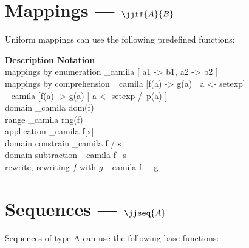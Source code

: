 \documentclass[english,a4paper]{article}
\begin{document}
\section{Mappings --- $\jjff{A}{B}$ }

Uniform mappings can use the following predefined functions:

\begin{framed}
\noindent \textbf{Description}  \hfill  \textbf{Notation} \ \  \\
 mappings by enumeration   \dotfill  \_camila{ [ a1 -> b1, a2 -> b2 ] } \\
 mappings by comprehension \dotfill  \_camila{ [f(a) -> g(a) | a <- setexp]} \\
                     \mbox{} \hfill  \_camila{ [f(a) -> g(a) | a <- setexp /\ p(a) ]} \\ 
 domain                    \dotfill  \_camila{ dom(f)} \\
 range                     \dotfill  \_camila{ rng(f) } \\
 application               \dotfill  \_camila{ f[x] } \\
 domain constrain          \dotfill  \_camila{ f / s} \\
 domain subtraction        \dotfill  \_camila{ f \ s} \\
 rewrite, rewriting $f$ with $g$ \dotfill   \_camila{ f + g}
\end{framed}

\section{Sequences --- $\jjseq{A}$}

Sequences of type A can use the following base functions:
\end{document}
